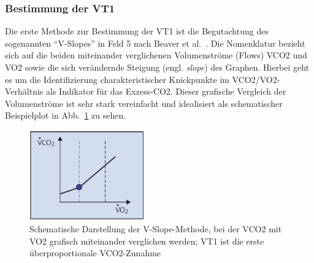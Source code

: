 \subsubsection{Bestimmung der VT1}

Die erste Methode zur Bestimmung der VT1 ist die Begutachtung des sogenannten "`V-Slopes"' in Feld 5 nach Beaver et al.~\cite{Beaver.1986}. Die Nomenklatur bezieht sich auf die beiden miteinander verglichenen Volumenströme (Flows) \acs{VCO2} und \acs{VO2} sowie die sich verändernde Steigung (engl. \textsl{slope}) des Graphen. Hierbei geht es um die Identifizierung charakteristischer Knickpunkte im \acs{VCO2}/\acs{VO2}-Verhältnis als Indikator für das Exzess-\acs{CO2}. Dieser grafische Vergleich der Volumenströme ist sehr stark vereinfacht und idealisiert als schematischer Beispielplot in Abb.~\ref{pic:pic4} zu sehen.

\begin{figure}[H]
	\centering
	\includegraphics[width=50mm]{Bilder/vslope.png}
	\caption[Schematische Darstellung der V-Slope-Methode]{Schematische Darstellung der V-Slope-Methode, bei der \acs{VCO2} mit \acs{VO2} grafisch miteinander verglichen werden; VT1 ist die erste überproportionale \acs{VCO2}-Zunahme~\cite{Kroidl.2015}}
	\label{pic:pic4}
\end{figure}

